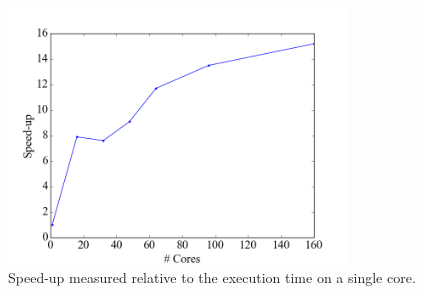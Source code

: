 \documentclass{anstrans}
\begin{document}

\begin{figure}[h]
    \centering
    \includegraphics[width=9cm]{figures/speedup.png}
    \caption{Speed-up measured relative to the execution time on a single core.}
    \label{fig:speedup}
\end{figure}

%
\end{document}
